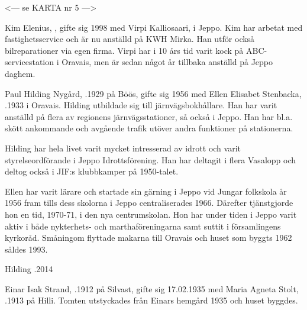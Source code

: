 
<--- se KARTA nr 5 --->




Kim Elenius, , gifte sig 1998 med Virpi Kalliosaari,  i Jeppo. Kim har arbetat med fastighetsservice och är nu anställd på KWH Mirka. Han utför också bilreparationer via egen firma. Virpi har i 10 års tid varit kock på ABC-servicestation i Oravais, men är sedan något år tillbaka anställd på Jeppo daghem.
\begin{jhchildren}
  \item {}
  \item {}
\end{jhchildren}


Paul Hilding Nygård, .1929 på Böös, gifte sig 1956 med Ellen Elisabet Stenbacka, .1933 i Oravais. Hilding utbildade sig till järnvägsbokhållare. Han har varit anställd på flera av regionens järnvägsstationer, så också i Jeppo. Han har bl.a. skött ankommande och avgående trafik utöver andra  funktioner på stationerna.

Hilding har hela livet varit mycket intresserad av idrott och varit styrelseordförande i Jeppo Idrottsförening. Han har deltagit i flera Vasalopp och deltog också i JIF:s klubbkamper på 1950-talet.

Ellen har varit lärare och startade sin gärning i Jeppo vid Jungar folkskola år 1956 fram tills dess skolorna i Jeppo centraliserades 1966. Därefter tjänstgjorde hon en tid, 1970-71, i den nya centrumskolan. Hon har under tiden i Jeppo varit aktiv i både nykterhets- och marthaföreningarna samt suttit i församlingens kyrkoråd. Småningom flyttade makarna till Oravais och huset som byggts 1962 såldes 1993.

Hilding .2014




Einar Isak Strand, .1912 på Silvast, gifte sig 17.02.1935 med Maria Agneta Stolt, .1913 på Hilli. Tomten utstyckades från Einars hemgård 1935 och huset byggdes.

